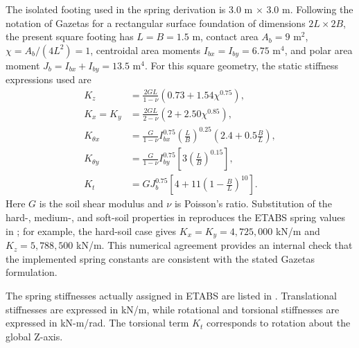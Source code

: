The isolated footing used in the spring derivation is 3.0 m $\times$ 3.0 m. Following the notation of Gazetas for a rectangular surface foundation of dimensions $2L\times2B$, the present square footing has $L=B=1.5$ m, contact area $A_b=9$ m$^2$, $\chi=A_b/(4L^2)=1$, centroidal area moments $I_{bx}=I_{by}=6.75$ m$^4$, and polar area moment $J_b=I_{bx}+I_{by}=13.5$ m$^4$. For this square geometry, the static stiffness expressions used are
\begin{align}
K_z &= \frac{2GL}{1-\nu}\left(0.73+1.54\chi^{0.75}\right), \label{eq:gazetas_kz}\\
K_x=K_y &= \frac{2GL}{2-\nu}\left(2+2.50\chi^{0.85}\right), \label{eq:gazetas_kxy}\\
K_{\theta x} &= \frac{G}{1-\nu}I_{bx}^{0.75}\left(\frac{L}{B}\right)^{0.25}
\left(2.4+0.5\frac{B}{L}\right), \label{eq:gazetas_krx}\\
K_{\theta y} &= \frac{G}{1-\nu}I_{by}^{0.75}
\left[3\left(\frac{L}{B}\right)^{0.15}\right], \label{eq:gazetas_kry}\\
K_t &= GJ_b^{0.75}\left[4+11\left(1-\frac{B}{L}\right)^{10}\right]. \label{eq:gazetas_kt}
\end{align}
Here $G$ is the soil shear modulus and $\nu$ is Poisson's ratio. Substitution of the hard-, medium-, and soft-soil properties in  reproduces the ETABS spring values in ; for example, the hard-soil case gives $K_x=K_y=4{,}725{,}000$ kN/m and $K_z=5{,}788{,}500$ kN/m. This numerical agreement provides an internal check that the implemented spring constants are consistent with the stated Gazetas formulation.

The spring stiffnesses actually assigned in ETABS are listed in . Translational stiffnesses are expressed in kN/m, while rotational and torsional stiffnesses are expressed in kN-m/rad. The torsional term $K_t$ corresponds to rotation about the global Z-axis.

\begin{table}[htbp]
\caption{Foundation spring stiffness inputs used in ETABS}
\label{tab:spring_stiffness_methodology}
\centering
{}
\end{table}

